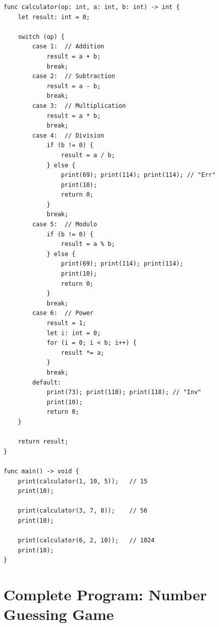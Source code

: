 \documentclass[12pt,a4paper,oneside]{book}
\begin{document}
\begin{lstlisting}[style=algo, caption={Simple Integer Calculator}]
func calculator(op: int, a: int, b: int) -> int {
    let result: int = 0;
    
    switch (op) {
        case 1:  // Addition
            result = a + b;
            break;
        case 2:  // Subtraction
            result = a - b;
            break;
        case 3:  // Multiplication
            result = a * b;
            break;
        case 4:  // Division
            if (b != 0) {
                result = a / b;
            } else {
                print(69); print(114); print(114); // "Err"
                print(10);
                return 0;
            }
            break;
        case 5:  // Modulo
            if (b != 0) {
                result = a % b;
            } else {
                print(69); print(114); print(114);
                print(10);
                return 0;
            }
            break;
        case 6:  // Power
            result = 1;
            let i: int = 0;
            for (i = 0; i < b; i++) {
                result *= a;
            }
            break;
        default:
            print(73); print(110); print(118); // "Inv"
            print(10);
            return 0;
    }
    
    return result;
}

func main() -> void {
    print(calculator(1, 10, 5));   // 15
    print(10);
    
    print(calculator(3, 7, 8));    // 56
    print(10);
    
    print(calculator(6, 2, 10));   // 1024
    print(10);
}
\end{lstlisting}

\section{Complete Program: Number Guessing Game}
\end{document}
